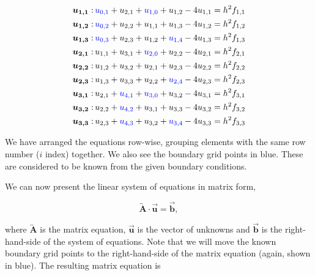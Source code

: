 \documentclass[11pt]{report}
\begin{document}
\begin{subequations}
\begin{align}
\bm{u_{1,1}}: 
\thinspace  & \textcolor{blue}{u_{0,1}} + u_{2,1} + \textcolor{blue}{u_{1,0}} + u_{1,2} - 4u_{1,1} = h^2 f_{1,1} \\
\bm{u_{1,2}}: 
\thinspace  & \textcolor{blue}{u_{0,2}} + u_{2,2} + u_{1,1} + u_{1,3} - 4u_{1,2} = h^2 f_{1,2} \\
\bm{u_{1,3}}: 
\thinspace  & \textcolor{blue}{u_{0,3}} + u_{2,3} + u_{1,2} + \textcolor{blue}{u_{1,4}} - 4u_{1,3} = h^2 f_{1,3} \\
\bm{u_{2,1}}: 
\thinspace  & u_{1,1} + u_{3,1} + \textcolor{blue}{u_{2,0}} + u_{2,2} - 4u_{2,1} = h^2 f_{2,1} \\
\bm{u_{2,2}}:
\thinspace  & u_{1,2} + u_{3,2} + u_{2,1} + u_{2,3} - 4u_{2,2} = h^2 f_{2,2} \\
\bm{u_{2,3}}: 
\thinspace  & u_{1,3} + u_{3,3} + u_{2,2} + \textcolor{blue}{u_{2,4}} - 4u_{2,3} = h^2 f_{2,3} \\
\bm{u_{3,1}}: 
\thinspace  & u_{2,1} + \textcolor{blue}{u_{4,1}} + \textcolor{blue}{u_{3,0}} + u_{3,2} - 4u_{3,1} = h^2 f_{3,1} \\
\bm{u_{3,2}}: 
\thinspace  & u_{2,2} + \textcolor{blue}{u_{4,2}} + u_{3,1} + u_{3,3} - 4u_{3,2} = h^2 f_{3,2} \\
\bm{u_{3,3}}: 
\thinspace  & u_{2,3} + \textcolor{blue}{u_{4,3}} + u_{3,2} + \textcolor{blue}{u_{3,4}} - 4u_{3,3} = h^2 f_{3,3}
\end{align}
\end{subequations}

\vspace{0.3cm}
We have arranged the equations row-wise, grouping elements with the same row number ($i$ index) together. We 
also see the boundary grid points in blue. These are considered to be known from the given boundary conditions.
\newline

We can now present the linear system of equations in matrix form,

\begin{equation}
\overleftrightarrow{\textbf{A}} \cdot \overrightarrow{\textbf{u}} = \overrightarrow{\textbf{b}},
\end{equation}

\vspace{0.3cm}

where $\overleftrightarrow{\textbf{A}}$ is the matrix equation, $\overrightarrow{\textbf{u}}$ is the vector of unknowns and $\overrightarrow{\textbf{b}}$ is the right-hand-side of the system of equations. Note that we will move the known boundary grid points to the right-hand-side of the matrix equation (again, shown in blue). The resulting matrix equation is
\end{document}
